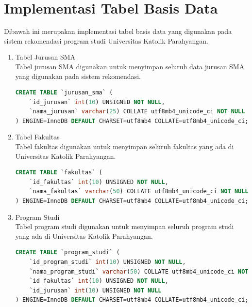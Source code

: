 \section{Implementasi Tabel Basis Data}
\label{sec:implementasi tabel basis data}

Dibawah ini merupakan implementasi tabel basis data yang digunakan pada sistem rekomendasi program studi Universitas Katolik Parahyangan. 

\lstset{numbers=left}

\begin{enumerate}
    \item Tabel Jurusan SMA\\
    Tabel jurusan SMA digunakan untuk menyimpan seluruh data jurusan SMA yang digunakan pada sistem rekomendasi.
    
\begin{lstlisting}[language=SQL, caption=Implementasi tabel jurusan SMA]
CREATE TABLE `jurusan_sma` ( 
    `id_jurusan` int(10) UNSIGNED NOT NULL,
    `nama_jurusan` varchar(25) COLLATE utf8mb4_unicode_ci NOT NULL
) ENGINE=InnoDB DEFAULT CHARSET=utf8mb4 COLLATE=utf8mb4_unicode_ci;
\end{lstlisting}
    
    \item Tabel Fakultas\\
    Tabel fakultas digunakan untuk menyimpan seluruh fakultas yang ada di Universitas Katolik Parahyangan.
    
\begin{lstlisting}[language=SQL, caption=Implementasi tabel ]
CREATE TABLE `fakultas` (
    `id_fakultas` int(10) UNSIGNED NOT NULL,
    `nama_fakultas` varchar(50) COLLATE utf8mb4_unicode_ci NOT NULL
) ENGINE=InnoDB DEFAULT CHARSET=utf8mb4 COLLATE=utf8mb4_unicode_ci;    
\end{lstlisting}

    \item Program Studi\\
    Tabel program studi digunakan untuk menyimpan seluruh program studi yang ada di Universitas Katolik Parahyangan.
    
\begin{lstlisting}[language=SQL, caption=Implementasi tabel ]
CREATE TABLE `program_studi` (
    `id_program_studi` int(10) UNSIGNED NOT NULL,
    `nama_program_studi` varchar(50) COLLATE utf8mb4_unicode_ci NOT NULL,
    `id_fakultas` int(10) UNSIGNED NOT NULL,
    `id_jurusan` int(10) UNSIGNED NOT NULL
) ENGINE=InnoDB DEFAULT CHARSET=utf8mb4 COLLATE=utf8mb4_unicode_ci;
\end{lstlisting}
    

\end{enumerate}
